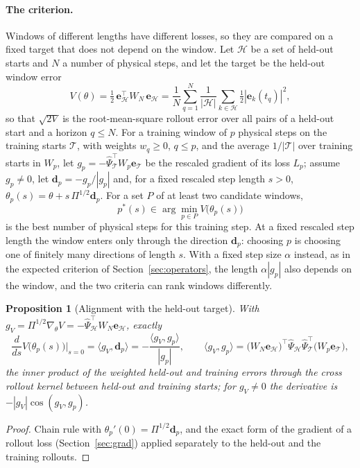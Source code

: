 \documentclass[11pt]{article}
\newtheorem{proposition}{Proposition}
\theoremstyle{definition}
\theoremstyle{remark}
\newcommand{\ee}{\mathbf{e}}
\newcommand{\Psih}{\hat\Psi}
\begin{document}
\paragraph{The criterion.}
Windows of different lengths have different losses, so they are compared on a fixed target that does not depend on the window.
Let $\mathcal H$ be a set of held-out starts and $N$ a number of physical steps, and let the target be the held-out window error
\[
V(\theta)=\tfrac12\,\ee_{\mathcal H}^\top W_N\,\ee_{\mathcal H}=\frac1{N}\sum_{q=1}^N\frac1{|\mathcal H|}\sum_{k\in\mathcal H}\tfrac12|\ee_k(t_q)|^2,
\]
so that $\sqrt{2V}$ is the root-mean-square rollout error over all pairs of a held-out start and a horizon $q\le N$.
For a training window of $p$ physical steps on the training starts $\mathcal T$, with weights $w_q\ge0$, $q\le p$, and the average $1/|\mathcal T|$ over training starts in $W_p$, let $g_p=-\Psih_{\mathcal T}^\top W_p\ee_{\mathcal T}$ be the rescaled gradient of its loss $L_p$; assume $g_p\ne0$, let $\mathbf d_p=-g_p/|g_p|$ and, for a fixed rescaled step length $s>0$, $\theta_p(s)=\theta+s\,\Pi^{1/2}\mathbf d_p$.
For a set $P$ of at least two candidate windows,
\[
p^\ast(s)\in\arg\min_{p\in P}V\big(\theta_p(s)\big)
\]
is the best number of physical steps for this training step.
At a fixed rescaled step length the window enters only through the direction $\mathbf d_p$: choosing $p$ is choosing one of finitely many directions of length $s$.
With a fixed step size $\alpha$ instead, as in the expected criterion of Section~\ref{sec:operators}, the length $\alpha|g_p|$ also depends on the window, and the two criteria can rank windows differently.

\begin{proposition}[Alignment with the held-out target]\label{prop:align}
With $g_V=\Pi^{1/2}\nabla_\theta V=-\Psih_{\mathcal H}^\top W_N\ee_{\mathcal H}$, exactly
\[
\frac{d}{ds}V\big(\theta_p(s)\big)\Big|_{s=0}=\langle g_V,\mathbf d_p\rangle=-\frac{\langle g_V,g_p\rangle}{|g_p|},\qquad
\langle g_V,g_p\rangle=\big(W_N\ee_{\mathcal H}\big)^\top\Psih_{\mathcal H}\Psih_{\mathcal T}^\top\big(W_p\ee_{\mathcal T}\big),
\]
the inner product of the weighted held-out and training errors through the cross rollout kernel between held-out and training starts; for $g_V\ne0$ the derivative is $-|g_V|\cos(g_V,g_p)$.
\end{proposition}

\begin{proof}
Chain rule with $\theta_p'(0)=\Pi^{1/2}\mathbf d_p$, and the exact form of the gradient of a rollout loss (Section~\ref{sec:grad}) applied separately to the held-out and the training rollouts.
\end{proof}
\end{document}
